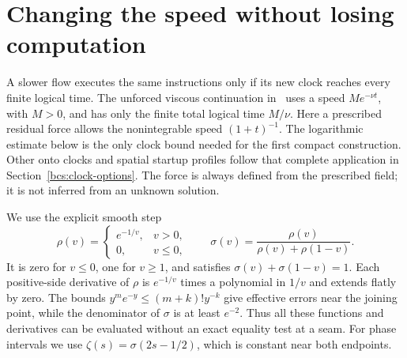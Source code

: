 \section{Changing the speed without losing computation}\label{bcs:clocks-section}
A slower flow executes the same instructions only if its new clock reaches every finite logical time. The unforced viscous continuation in~\cite[Section~6.B]{CardonaMirandaPeraltaSalasPresas2021} uses a speed $Me^{-\nu t}$, with $M>0$, and has only the finite total logical time $M/\nu$. Here a prescribed residual force allows the nonintegrable speed $(1+t)^{-1}$. The logarithmic estimate below is the only clock bound needed for the first compact construction. Other onto clocks and spatial startup profiles follow that complete application in Section~\ref{bcs:clock-options}. The force is always defined from the prescribed field; it is not inferred from an unknown solution.

We use the explicit smooth step
\begin{equation}\label{bcs:smooth-step}
 \rho(v)=\begin{cases}e^{-1/v},&v>0,\\0,&v\le0,\end{cases}
 \qquad \sigma(v)=\frac{\rho(v)}{\rho(v)+\rho(1-v)}.
\end{equation}
It is zero for $v\le0$, one for $v\ge1$, and satisfies
$\sigma(v)+\sigma(1-v)=1$. Each positive-side derivative of $\rho$ is
$e^{-1/v}$ times a polynomial in $1/v$ and extends flatly by zero.
The bounds $y^m e^{-y}\le(m+k)!y^{-k}$ give effective errors near the
joining point, while the denominator of $\sigma$ is at least $e^{-2}$.
Thus all these functions and derivatives can be evaluated without an
exact equality test at a seam. For phase intervals we use
$\zeta(s)=\sigma(2s-1/2)$, which is constant near both endpoints.

